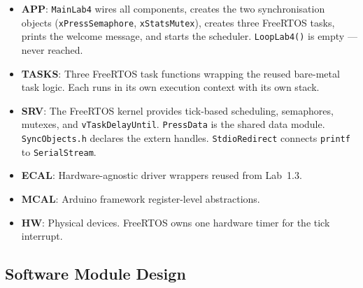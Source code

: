 \documentclass[12pt]{article}
\begin{document}
\begin{itemize}
  \item \textbf{APP}: \texttt{MainLab4} wires all components, creates the two synchronisation objects (\texttt{xPressSemaphore}, \texttt{xStatsMutex}), creates three FreeRTOS tasks, prints the welcome message, and starts the scheduler. \texttt{LoopLab4()} is empty — never reached.
  \item \textbf{TASKS}: Three FreeRTOS task functions wrapping the reused bare-metal task logic. Each runs in its own execution context with its own stack.
  \item \textbf{SRV}: The FreeRTOS kernel provides tick-based scheduling, semaphores, mutexes, and \texttt{vTaskDelayUntil}. \texttt{PressData} is the shared data module. \texttt{SyncObjects.h} declares the extern handles. \texttt{StdioRedirect} connects \texttt{printf} to \texttt{SerialStream}.
  \item \textbf{ECAL}: Hardware-agnostic driver wrappers reused from Lab~1.3.
  \item \textbf{MCAL}: Arduino framework register-level abstractions.
  \item \textbf{HW}: Physical devices. FreeRTOS owns one hardware timer for the tick interrupt.
\end{itemize}

\subsection{Software Module Design}
\end{document}
